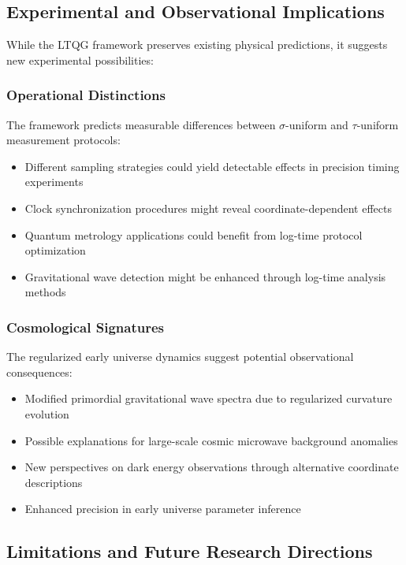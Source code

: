 \subsection{Experimental and Observational Implications}
\label{subsec:experimental_implications}

While the LTQG framework preserves existing physical predictions, it suggests new experimental possibilities:

\subsubsection{Operational Distinctions}

The framework predicts measurable differences between $\sigma$-uniform and $\tau$-uniform measurement protocols:
\begin{itemize}
\item Different sampling strategies could yield detectable effects in precision timing experiments
\item Clock synchronization procedures might reveal coordinate-dependent effects
\item Quantum metrology applications could benefit from log-time protocol optimization
\item Gravitational wave detection might be enhanced through log-time analysis methods
\end{itemize}

\subsubsection{Cosmological Signatures}

The regularized early universe dynamics suggest potential observational consequences:
\begin{itemize}
\item Modified primordial gravitational wave spectra due to regularized curvature evolution
\item Possible explanations for large-scale cosmic microwave background anomalies
\item New perspectives on dark energy observations through alternative coordinate descriptions
\item Enhanced precision in early universe parameter inference
\end{itemize}

\subsection{Limitations and Future Research Directions}
\label{subsec:limitations_future}

